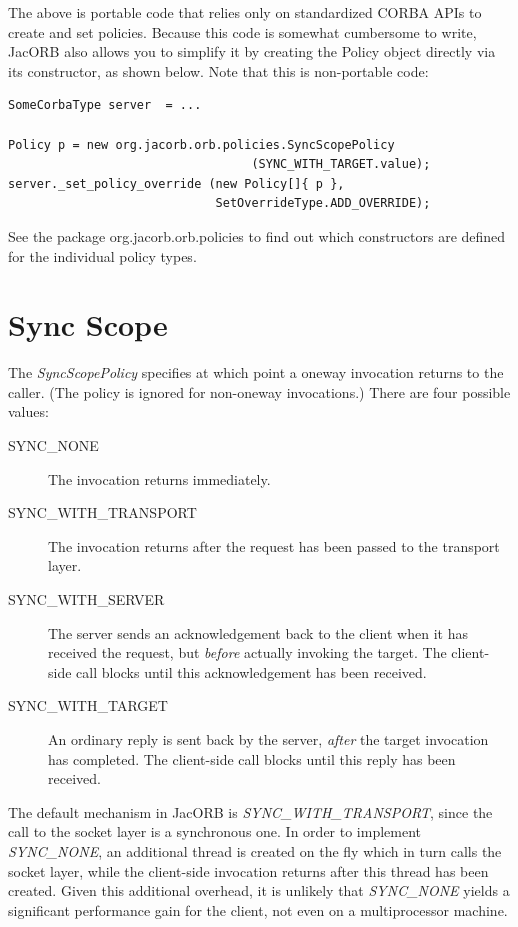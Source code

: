 The above is portable code that relies only on standardized CORBA APIs
to create and set policies.  Because this code is somewhat cumbersome
to write, JacORB also allows you to simplify it by creating the Policy
object directly via its constructor, as shown below. Note that this is
non-portable code:

\begin{verbatim}
SomeCorbaType server  = ...

Policy p = new org.jacorb.orb.policies.SyncScopePolicy
                                  (SYNC_WITH_TARGET.value);
server._set_policy_override (new Policy[]{ p },
                             SetOverrideType.ADD_OVERRIDE);
\end{verbatim}

See the package org.jacorb.orb.policies to find out which
constructors are defined for the individual policy types.

\section{Sync Scope}

The \emph{SyncScopePolicy} specifies at which point a oneway
invocation returns to the caller.  (The policy is ignored for
non-oneway invocations.)  There are four possible
values:

\begin{description}
\item[SYNC\_NONE] The invocation returns immediately.
\item[SYNC\_WITH\_TRANSPORT] The invocation returns after the request
  has been passed to the transport layer.
\item[SYNC\_WITH\_SERVER] The server sends an
  acknowledgement back to the client when it has received the
  request, but \emph{before} actually invoking the target.  The
  client-side call blocks until this acknowledgement has been
  received.
\item[SYNC\_WITH\_TARGET] An ordinary reply is sent back by the
  server, \emph{after} the target invocation has completed.  The
  client-side call blocks until this reply has been received.
\end{description}

The default mechanism in JacORB is \emph{SYNC\_WITH\_TRANSPORT},
since the call to the socket layer is a synchronous one.  In order to
implement \emph{SYNC\_NONE}, an additional thread is created on the
fly which in turn calls the socket layer, while the client-side
invocation returns after this thread has been created.  Given this
additional overhead, it is unlikely that \emph{SYNC\_NONE} yields a
significant performance gain for the client, not even on a
multiprocessor machine.

